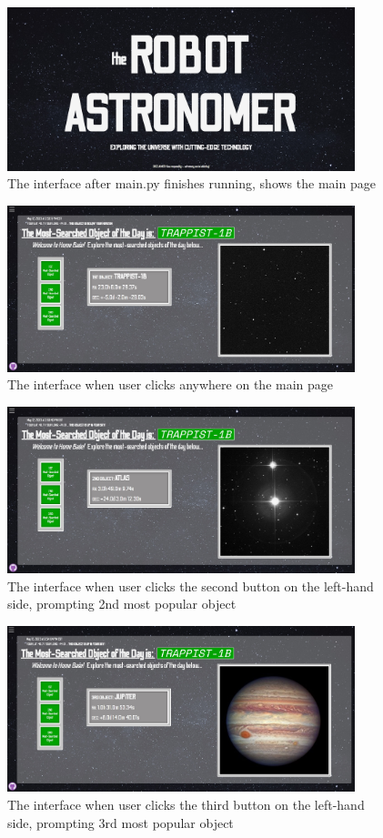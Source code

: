 \documentclass[12pt,letterpaper]{article}
\begin{document}
\begin{figure}[h]
\caption{The interface after main.py finishes running, shows the main page}
\centering
\includegraphics[width=0.9\textwidth]{mainpage.jpg}
\end{figure}
\begin{figure}[h]
\caption{The interface when user clicks anywhere on the main page}
\centering
\includegraphics[width=0.9\textwidth]{page1.jpg}
\end{figure}
\begin{figure}[h]
\caption{The interface when user clicks the second button on the left-hand side, prompting 2nd most popular object}
\centering
\includegraphics[width=0.9\textwidth]{page2.jpg}
\end{figure}
\begin{figure}[h]
\caption{The interface when user clicks the third button on the left-hand side, prompting 3rd most popular object}
\centering
\includegraphics[width=0.9\textwidth]{page3.jpg}
\end{figure}
\end{document}
